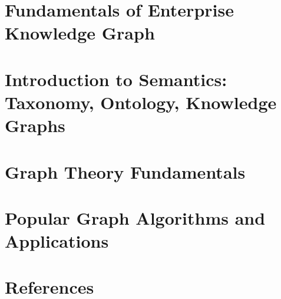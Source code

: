\section[Intro]{Fundamentals of Enterprise Knowledge Graph }


\section[Sem]{Introduction to Semantics: Taxonomy, Ontology, Knowledge Graphs}


\section[Theory]{Graph Theory Fundamentals }


\section[Algos]{Popular Graph Algorithms and Applications }



% 

% 

% 

\section[Refs]{References}
